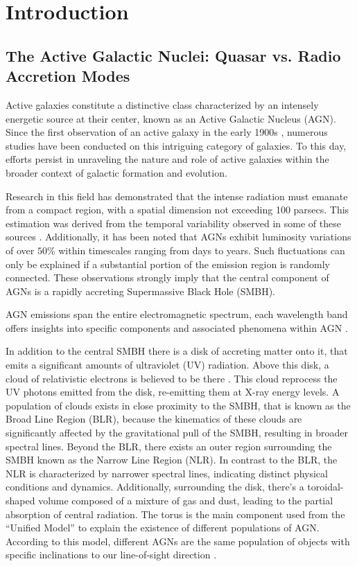 \chapter{Introduction}

\section{The Active Galactic Nuclei: Quasar vs. Radio Accretion Modes}
Active galaxies constitute a distinctive class characterized by an intensely energetic source at their center, known as an Active Galactic Nucleus (AGN). Since the first observation of an active galaxy in the early 1900s \cite{Shields_1999}, numerous studies have been conducted on this intriguing category of galaxies. To this day, efforts persist in unraveling the nature and role of active galaxies within the broader context of galactic formation and evolution.

Research in this field has demonstrated that the intense radiation must emanate from a compact region, with a spatial dimension not exceeding 100 parsecs. This estimation was derived from the temporal variability observed in some of these sources \cite{1959ApJ...130...38W}. Additionally, it has been noted that AGNs exhibit luminosity variations of over $50\%$ within timescales ranging from days to years. Such fluctuations can only be explained if a substantial portion of the emission region is randomly connected. These observations strongly imply that the central component of AGNs is a rapidly accreting Supermassive Black Hole (SMBH).

AGN emissions span the entire electromagnetic spectrum, each wavelength band offers insights into specific components and associated phenomena within AGN \cite{2017NatAs...1E.194P}. 

In addition to the central SMBH \cite{2006ApJ...652..216R} there is a disk of accreting matter onto it, that emits a significant amounts of ultraviolet (UV) radiation. Above this disk, a cloud of relativistic electrons is believed to be there \cite{2005ASPC..343..435K}. This cloud reprocess the UV photons emitted from the disk, re-emitting them at X-ray energy levels.
A population of clouds exists in close proximity to the SMBH, that is known as the Broad Line Region
(BLR), because the kinematics of these clouds are significantly affected by the gravitational pull of the SMBH, resulting in broader spectral lines. Beyond the BLR, there exists an outer region surrounding the SMBH known as the Narrow Line Region (NLR). In contrast to the BLR, the NLR is characterized by narrower spectral lines, indicating distinct physical conditions and dynamics. 
Additionally, surrounding the disk, there's a toroidal-shaped volume composed of a mixture of gas and dust, leading to the partial absorption of central radiation. The torus is the main component used from the “Unified Model” \cite{1995PASP..107..803U} to explain the existence of different populations of AGN. According to this model, different AGNs are the same population of objects with specific inclinations to our line-of-sight direction \cite{1993ARA&A..31..473A}.

